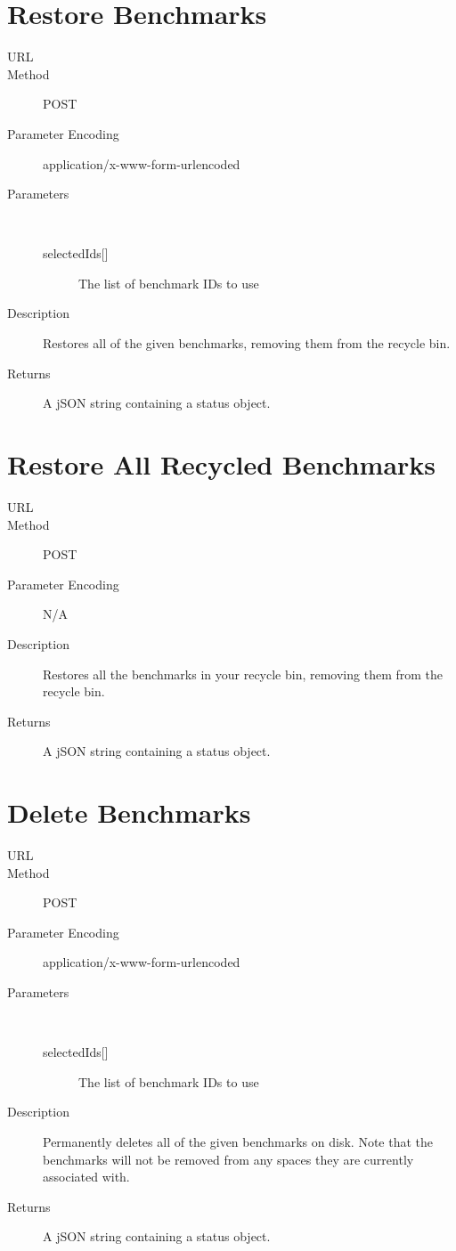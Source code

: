\section{Restore Benchmarks}
\begin{description}
\item [URL] 
\item [Method] POST
\item [Parameter Encoding] application/x-www-form-urlencoded
\item [Parameters] \
	\begin{description}
	\item [{selectedIds[]}]  The list of benchmark IDs to use
	\end{description}
\item [Description] Restores all of the given benchmarks, removing them from the recycle bin.
\item [Returns] A jSON string containing a status object.
\end{description}


\section{Restore All Recycled Benchmarks}
\begin{description}
\item [URL] 
\item [Method] POST
\item [Parameter Encoding] N/A
\item [Description] Restores all the benchmarks in your recycle bin, removing them from the recycle bin.
\item [Returns] A jSON string containing a status object.
\end{description}


\section{Delete Benchmarks}
\begin{description}
\item [URL] 
\item [Method] POST
\item [Parameter Encoding] application/x-www-form-urlencoded
\item [Parameters] \
	\begin{description}
	\item [{selectedIds[]}]  The list of benchmark IDs to use
	\end{description}
\item [Description] Permanently deletes all of the given benchmarks on disk. Note that the benchmarks will not be removed from any spaces they are currently associated with.
\item [Returns] A jSON string containing a status object.
\end{description}


